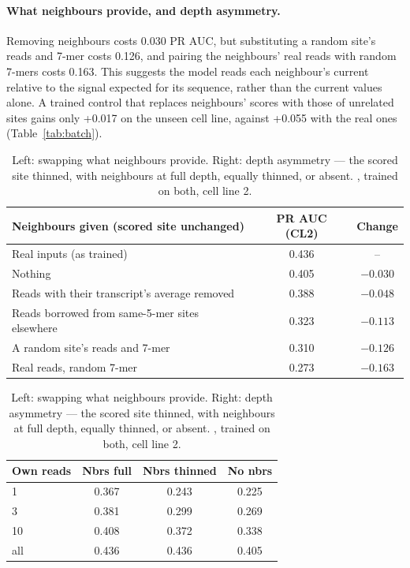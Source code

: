 \documentclass[11pt,a4paper]{article}
\newcommand{\mdl}[1]{\texttt{\detokenize{#1}}}
\newcommand{\cltwo}{CL2}
\begin{document}
\paragraph{What neighbours provide, and depth asymmetry.}
Removing neighbours costs 0.030 PR AUC, but substituting a random site's reads
and 7-mer costs 0.126, and pairing the neighbours' real reads with random
7-mers costs 0.163. This suggests the model reads each neighbour's current
relative to the signal expected for its sequence, rather than the current
values alone. A trained control that replaces neighbours' scores with those of
unrelated sites gains only +0.017 on the unseen cell line, against +0.055 with
the real ones (Table~\ref{tab:batch}).
\begin{table}[H]
    \centering\small
    \begin{tabular}{lcc}
        \toprule
        \textbf{Neighbours given (scored site unchanged)} & \textbf{PR AUC (\cltwo)} & \textbf{Change} \\
        \midrule
        Real inputs (as trained) & 0.436 & -- \\
        Nothing & 0.405 & $-0.030$ \\
        Reads with their transcript's average removed & 0.388 & $-0.048$ \\
        Reads borrowed from same-5-mer sites elsewhere & 0.323 & $-0.113$ \\
        A random site's reads and 7-mer & 0.310 & $-0.126$ \\
        Real reads, random 7-mer & 0.273 & $-0.163$ \\
        \bottomrule
    \end{tabular}
    \quad
    \begin{tabular}{lccc}
        \toprule
        \textbf{Own reads} & \textbf{Nbrs full} & \textbf{Nbrs thinned} & \textbf{No nbrs} \\
        \midrule
        1 & 0.367 & 0.243 & 0.225 \\
        3 & 0.381 & 0.299 & 0.269 \\
        10 & 0.408 & 0.372 & 0.338 \\
        all & 0.436 & 0.436 & 0.405 \\
        \bottomrule
    \end{tabular}
    \caption{Left: swapping what neighbours provide. Right: depth asymmetry
    --- the scored site thinned, with neighbours at full depth, equally
    thinned, or absent. \mdl{h2gcn_aux}, trained on both, cell line 2.}
    \label{tab:swap}
\end{table}
\end{document}
